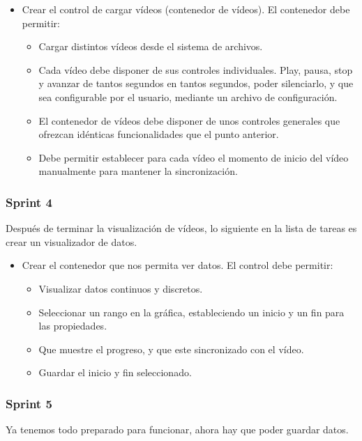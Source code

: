 \begin{itemize}
    \item Crear el control de cargar v\'{i}deos (contenedor de v\'{i}deos). El contenedor debe permitir:
    \begin{itemize}
        \item Cargar distintos v\'{i}deos desde el sistema de archivos.
        \item Cada v\'{i}deo debe disponer de sus controles individuales. Play, pausa, stop y avanzar de tantos segundos en tantos 
        segundos, poder silenciarlo, y que sea configurable por el usuario, mediante un archivo de configuraci\'{o}n.
        \item El contenedor de v\'{i}deos debe disponer de unos controles generales que ofrezcan id\'enticas funcionalidades
        que el punto anterior.
        \item Debe permitir establecer para cada v\'{i}deo el momento de inicio del v\'{i}deo manualmente para mantener la 
        sincronizaci\'{o}n.
    \end{itemize}
\end{itemize}

\subsubsection{Sprint 4}
Despu\'{e}s de terminar la visualizaci\'{o}n de v\'{i}deos, lo siguiente en la lista de tareas es crear un visualizador de datos.

\begin{itemize}
    \item Crear el contenedor que nos permita ver datos. El control debe permitir:
    \begin{itemize}
        \item Visualizar datos continuos y discretos.
        \item Seleccionar un rango en la gr\'{a}fica, estableciendo un inicio y un fin para las propiedades.
        \item Que muestre el progreso, y que este sincronizado con el v\'{i}deo.
        \item Guardar el inicio y fin seleccionado.
    \end{itemize}
\end{itemize}

\subsubsection{Sprint 5}
Ya tenemos todo preparado para funcionar, ahora hay que poder guardar datos.

